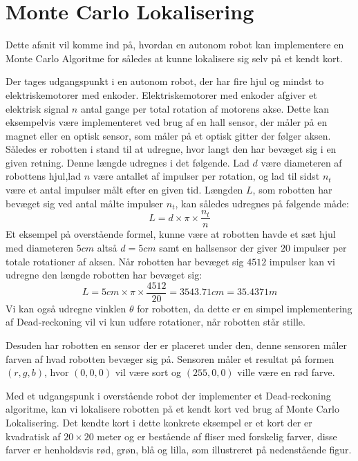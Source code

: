 \documentclass[../../SRP.tex]{subfiles}
\begin{document}
\chapter{Monte Carlo Lokalisering}
Dette afsnit vil komme ind på, hvordan en autonom robot kan implementere en Monte Carlo Algoritme for således at kunne lokalisere sig selv på et kendt kort.  

 Der tages udgangspunkt i en autonom robot, der har fire hjul og mindst to elektriskemotorer med enkoder. Elektriskemotorer med enkoder afgiver et elektrisk signal $n$ antal gange per total rotation af motorens akse. Dette kan eksempelvis være implementeret ved brug af en hall sensor, der måler på en magnet eller en optisk sensor, som måler på et optisk gitter der følger aksen. Således er robotten i stand til at udregne, hvor langt den har bevæget sig i en given retning. Denne længde udregnes i det følgende. Lad $d$ være diameteren af robottens hjul,lad $n$ være antallet af impulser per rotation, og lad til sidst $n_t$ være et antal impulser målt efter en given tid. Længden $L$, som robotten har bevæget sig ved antal målte impulser $n_t$, kan således udregnes på følgende måde:
\begin{equation}
  L = d \times \pi \times \frac{n_t}{n}
\end{equation}
Et eksempel på overstående formel, kunne være at robotten havde et sæt hjul med diameteren $5cm$ altså $d = 5cm$ samt en hallsensor der giver $20$ impulser per totale rotationer af aksen. Når robotten har bevæget sig $4512$ impulser kan vi udregne den længde robotten har bevæget sig:
\begin{equation}
  L = 5cm \times \pi \times \frac{4512}{20} = 3543.71cm = 35.4371m
\end{equation}
Vi kan også udregne vinklen $\theta$ for robotten, da dette er en simpel implementering af Dead-reckoning vil vi kun udføre rotationer, når robotten står stille.

Desuden har robotten en sensor der er placeret under den, denne sensoren måler farven af hvad robotten bevæger sig på. Sensoren måler et resultat på formen $(r,g,b)$, hvor $(0,0,0)$ vil være sort og $(255,0,0)$ ville være en rød farve. 

Med et udgangspunk i overstående robot der implementer et Dead-reckoning algoritme, kan vi lokalisere robotten på et kendt kort ved brug af Monte Carlo Lokalisering. Det kendte kort i dette konkrete eksempel er et kort der er kvadratisk af $20 \times 20$ meter og er bestående af fliser med forskelig farver, disse farver er henholdsvis rød, grøn, blå og lilla, som illustreret på nedenstående figur.
\end{document}
